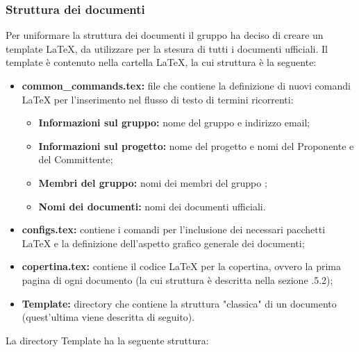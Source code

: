    \subsubsection{Struttura dei documenti}
        Per uniformare la struttura dei documenti il gruppo ha deciso di creare un template \LaTeX{}, da utilizzare per la stesura di tutti i documenti ufficiali. Il template è contenuto nella cartella \LaTeX{}, la cui struttura è la seguente:
        \begin{itemize}
          \item \textbf{common\_commands.tex:} file che contiene la definizione di nuovi comandi \LaTeX{} per l'inserimento nel flusso di testo di termini ricorrenti:
            \begin{itemize}
              \item \textbf{Informazioni sul gruppo:} nome del gruppo e indirizzo email;
              \item \textbf{Informazioni sul progetto:} nome del progetto e nomi del Proponente e del Committente;
              \item \textbf{Membri del gruppo:} nomi dei membri del gruppo \Gruppo;
              \item \textbf{Nomi dei documenti:} nomi dei documenti ufficiali.
            \end{itemize}
          \item \textbf{configs.tex:} contiene i comandi per l'inclusione dei necessari pacchetti \LaTeX{} e la definizione dell'aspetto grafico generale dei documenti;
          \item \textbf{copertina.tex:} contiene il codice \LaTeX{} per la copertina, ovvero la prima pagina di ogni documento (la cui struttura è descritta nella sezione .5.2);
          \item \textbf{Template:} directory che contiene la struttura "classica" di un documento (quest'ultima viene descritta di seguito).
        \end{itemize}
        La directory Template ha la seguente struttura:
